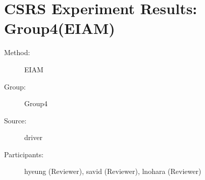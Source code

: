 \chapter {CSRS Experiment Results: Group4(EIAM)}	  
\small

\begin{description}
\item [Method:] EIAM
\item [Group:] Group4
\item [Source:] driver
\item [Participants:] hyeung (Reviewer), savid (Reviewer), lnohara (Reviewer)
\end{description}
